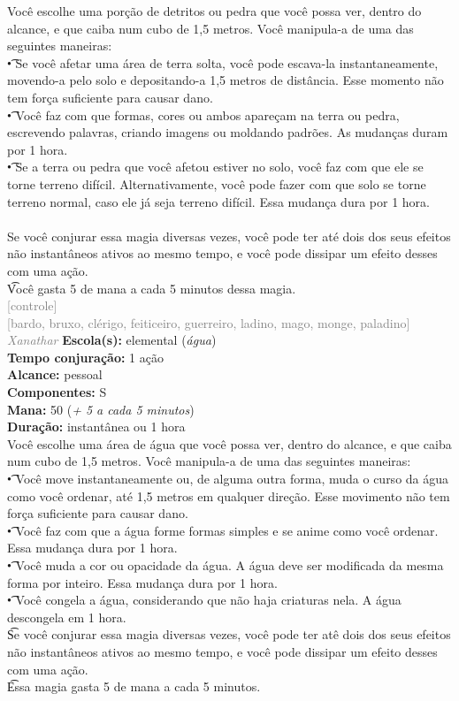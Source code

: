 \documentclass{RPG_Adventure}[2021/10/20]
\begin{document}
{\normalsize Você escolhe uma porção de detritos ou pedra que você possa ver, dentro do alcance, e que caiba num cubo de 1,5 metros. Você manipula-a de uma das seguintes maneiras: \\\t • Se você afetar uma área de terra solta, você pode escava-la instantaneamente, movendo-a pelo solo e depositando-a 1,5 metros de distância. Esse momento não tem força suficiente para causar dano.\\\t • Você faz com que formas, cores ou ambos apareçam na terra ou pedra, escrevendo palavras, criando imagens ou moldando padrões. As mudanças duram por 1 hora.\\\t • Se a terra ou pedra que você afetou estiver no solo, você faz com que ele se torne terreno difícil. Alternativamente, você pode fazer com que solo se torne terreno normal, caso ele já seja terreno difícil. Essa mudança dura por 1 hora.\\\\Se você conjurar essa magia diversas vezes, você pode ter até dois dos seus efeitos não instantâneos ativos ao mesmo tempo, e você pode dissipar um efeito desses com uma ação.\\\t Você gasta 5 de mana a cada 5 minutos dessa magia.\\}
{\scriptsize \textcolor{gray}{[controle]\\}}
{\scriptsize \textcolor{gray}{[bardo, bruxo, clérigo, feiticeiro, guerreiro, ladino, mago, monge, paladino]\\}}
{\tiny \textcolor{gray}{\textit{Xanathar}}}
{\small \t \textbf{Escola(s):} elemental (\textit{água})\\\t \textbf{Tempo conjuração:} 1 ação\\\t \textbf{Alcance:} pessoal\\\t \textbf{Componentes:} S\\\t \textbf{Mana:} 50 (\textit{+ 5 a cada 5 minutos})\\\t \textbf{Duração:} instantânea ou 1 hora\\}
{\normalsize Você escolhe uma área de água que você possa ver, dentro do alcance, e que caiba num cubo de 1,5 metros. Você manipula-a de uma das seguintes maneiras:\\\t • Você move instantaneamente ou, de alguma outra forma, muda o curso da água como você ordenar, até 1,5 metros em qualquer direção. Esse movimento não tem força suficiente para causar dano.\\\t • Você faz com que a água forme formas simples e se anime como você ordenar. Essa mudança dura por 1 hora.\\\t • Você muda a cor ou opacidade da água. A água deve ser modificada da mesma forma por inteiro. Essa mudança dura por 1 hora.\\\t • Você congela a água, considerando que não haja criaturas nela. A água descongela em 1 hora.\\\t Se você conjurar essa magia diversas vezes, você pode ter atê dois dos seus efeitos não instantâneos ativos ao mesmo tempo, e você pode dissipar um efeito desses com uma ação.\\\t Essa magia gasta 5 de mana a cada 5 minutos.\\}
\end{document}
